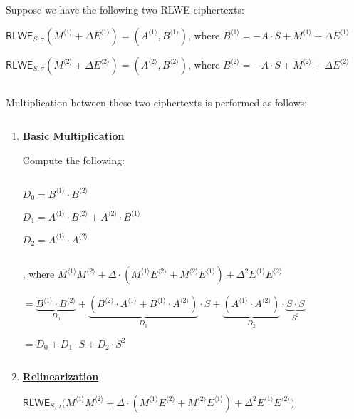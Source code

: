 \begin{tcolorbox}[title={\textbf{\tboxlabel{\ref*{subsec:bgv-mult-cipher}} BGV Ciphertext-to-Ciphertext Multiplication}}]

Suppose we have the following two RLWE ciphertexts:

$\textsf{RLWE}_{S, \sigma}(M^{\langle 1 \rangle} + \Delta E^{\langle 1 \rangle}) = (A^{\langle 1 \rangle}, B^{\langle 1 \rangle})$, \text{ } where $B^{\langle 1 \rangle} = -A \cdot S +  M^{\langle 1 \rangle} + \Delta E^{\langle 1 \rangle}$

$\textsf{RLWE}_{S, \sigma}(M^{\langle 2 \rangle} + \Delta E^{\langle 2 \rangle}) = (A^{\langle 2 \rangle}, B^{\langle 2 \rangle})$, \text{ } where $B^{\langle 2 \rangle} = -A \cdot S +  M^{\langle 2 \rangle} + \Delta E^{\langle 2 \rangle}$

$ $

Multiplication between these two ciphertexts is performed as follows:

$ $

\begin{enumerate}
\item \textbf{\underline{Basic Multiplication}}

Compute the following:

$ $

$D_0 = B^{\langle 1 \rangle}\cdot B^{\langle 2 \rangle}$

$D_1 = A^{\langle 1 \rangle}\cdot B^{\langle 2 \rangle} + A^{\langle 2 \rangle}\cdot B^{\langle 1 \rangle}$

$D_2 = A^{\langle 1 \rangle} \cdot A^{\langle 2 \rangle}$

$ $

, where $M^{\langle 1 \rangle}M^{\langle 2 \rangle} + \Delta\cdot (M^{\langle 1 \rangle}E^{\langle 2 \rangle} + M^{\langle 2 \rangle}E^{\langle 1 \rangle}) + \Delta^2E^{\langle 1 \rangle}E^{\langle 2 \rangle}$

$ = \underbrace{B^{\langle 1 \rangle}\cdot B^{\langle 2 \rangle}}_{D_0}  + \underbrace{(B^{\langle 2 \rangle}\cdot A^{\langle 1 \rangle} + B^{\langle 1 \rangle}\cdot A^{\langle 2 \rangle})}_{D_1} \cdot S + \underbrace{(A^{\langle 1 \rangle} \cdot A^{\langle 2 \rangle})}_{D_2} \cdot \underbrace{S \cdot S}_{S^2}$

$= D_0 + D_1\cdot S + D_2 \cdot S^2$

$ $

\item \textbf{\underline{Relinearization}} 

$\textsf{RLWE}_{S, \sigma}\bm(M^{\langle 1 \rangle}M^{\langle 2 \rangle} + \Delta\cdot (M^{\langle 1 \rangle}E^{\langle 2 \rangle} + M^{\langle 2 \rangle}E^{\langle 1 \rangle}) + \Delta^2E^{\langle 1 \rangle}E^{\langle 2 \rangle}\bm) $


\end{enumerate}
\end{tcolorbox}
